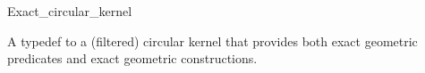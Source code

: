 \begin{ccRefClass}{Exact_circular_kernel}

\ccDefinition

A typedef to a (filtered) circular kernel that provides
both exact geometric predicates and exact geometric constructions.


\ccIsModel


\end{ccRefClass}
